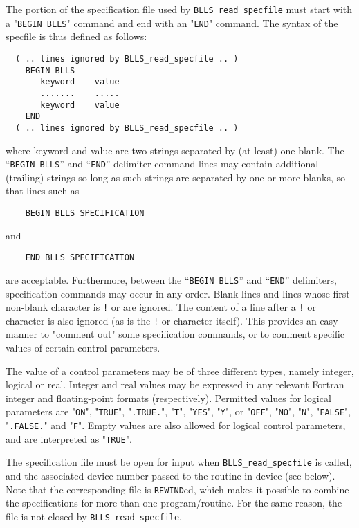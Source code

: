 \documentclass{galahad}
\newcommand{\packagename}{BLLS}
\begin{document}
The portion of the specification file used by
{\tt \packagename\_read\_specfile}
must start
with a "{\tt BEGIN \packagename}" command and end with an
"{\tt END}" command.  The syntax of the specfile is thus defined as follows:
\begin{verbatim}
  ( .. lines ignored by BLLS_read_specfile .. )
    BEGIN BLLS
       keyword    value
       .......    .....
       keyword    value
    END
  ( .. lines ignored by BLLS_read_specfile .. )
\end{verbatim}
where keyword and value are two strings separated by (at least) one blank.
The ``{\tt BEGIN \packagename}'' and ``{\tt END}'' delimiter command lines
may contain additional (trailing) strings so long as such strings are
separated by one or more blanks, so that lines such as
\begin{verbatim}
    BEGIN BLLS SPECIFICATION
\end{verbatim}
and
\begin{verbatim}
    END BLLS SPECIFICATION
\end{verbatim}
are acceptable. Furthermore,
between the
``{\tt BEGIN \packagename}'' and ``{\tt END}'' delimiters,
specification commands may occur in any order.  Blank lines and
lines whose first non-blank character is {\tt !} or {\tt *} are ignored.
The content
of a line after a {\tt !} or {\tt *} character is also
ignored (as is the {\tt !} or {\tt *}
character itself). This provides an easy manner to "comment out" some
specification commands, or to comment specific values
of certain control parameters.

The value of a control parameters may be of three different types, namely
integer, logical or real.
Integer and real values may be expressed in any relevant Fortran integer and
floating-point formats (respectively). Permitted values for logical
parameters are "{\tt ON}", "{\tt TRUE}", "{\tt .TRUE.}", "{\tt T}",
"{\tt YES}", "{\tt Y}", or "{\tt OFF}", "{\tt NO}",
"{\tt N}", "{\tt FALSE}", "{\tt .FALSE.}" and "{\tt F}".
Empty values are also allowed for
logical control parameters, and are interpreted as "{\tt TRUE}".

The specification file must be open for
input when {\tt \packagename\_read\_specfile}
is called, and the associated device number
passed to the routine in device (see below).
Note that the corresponding
file is {\tt REWIND}ed, which makes it possible to combine the specifications
for more than one program/routine.  For the same reason, the file is not
closed by {\tt \packagename\_read\_specfile}.
\end{document}
